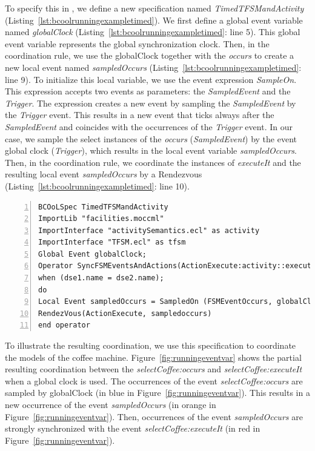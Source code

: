			
To specify this in \bcool, we define a new specification named \emph{TimedTFSMandActivity} (Listing~\ref{lst:bcoolrunningexampletimed}). We first define a global event variable named \emph{globalClock} (Listing~\ref{lst:bcoolrunningexampletimed}: line 5). This global event variable represents the global synchronization clock. Then, in the coordination rule, we use the globalClock together with the \dse \emph{occurs} to create a new local event named \emph{sampledOccurs} (Listing~\ref{lst:bcoolrunningexampletimed}: line 9). To initialize this local variable, we use the event expression \emph{SampleOn}. This expression accepts two events as parameters: the \emph{SampledEvent} and the \emph{Trigger}. The expression creates a new event by sampling the \emph{SampledEvent} by the \emph{Trigger} event. This results in a new event that ticks always after the \emph{SampledEvent} and coincides with the occurrences of the \emph{Trigger} event. In our case, we sample the select instances of the \dse \emph{occurs} (\ie \emph{SampledEvent}) by the event global clock (\ie \emph{Trigger}), which results in the local event variable \emph{sampledOccurs}. Then, in the coordination rule, we coordinate the instances of \dse \emph{executeIt} and the resulting local event \emph{sampledOccurs} by a Rendezvous (Listing~\ref{lst:bcoolrunningexampletimed}: line 10). 

\begin{lstlisting}[language=bcool,
caption={\bcool specification of an operator that illustrates the use of Event Variables},
label={lst:bcoolrunningexampletimed}, 
basicstyle=\scriptsize\ttfamily, backgroundcolor=\color{LGrey}, numbers=left, xleftmargin=2pt]
BCOoLSpec TimedTFSMandActivity
ImportLib "facilities.moccml"
ImportInterface "activitySemantics.ecl" as activity
ImportInterface "TFSM.ecl" as tfsm
Global Event globalClock;
Operator SyncFSMEventsAndActions(ActionExecute:activity::executeIt, FSMEventOccurs:tfsm::occurs)
when (dse1.name = dse2.name);
do
Local Event sampledOccurs = SampledOn (FSMEventOccurs, globalClock);
RendezVous(ActionExecute, sampledoccurs)
end operator
\end{lstlisting}



To illustrate the resulting coordination, we use this specification to coordinate the models of the coffee machine. Figure~\ref{fig:runningeventvar} shows the partial resulting coordination between the \mse \emph{selectCoffee:occurs} and \emph{selectCoffee:executeIt} when a global clock is used. The occurrences of the event \emph{selectCoffee:occurs} are sampled by globalClock (in blue in Figure~\ref{fig:runningeventvar}). This results in a new occurrence of the event \emph{sampledOccurs} (in orange in Figure~\ref{fig:runningeventvar}). Then, occurrences of the event \emph{sampledOccurs} are strongly synchronized with the event \emph{selectCoffee:executeIt} (in red in Figure~\ref{fig:runningeventvar}). 

